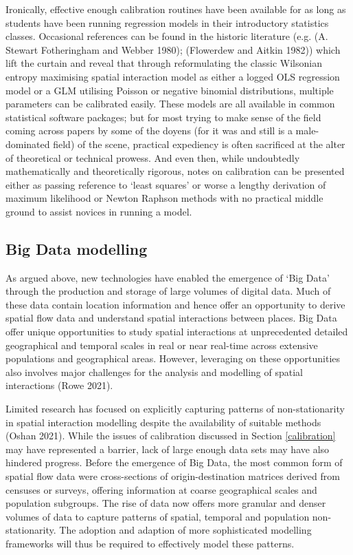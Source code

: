 \documentclass[11pt,letterpaper]{article}
\begin{document}
Ironically, effective enough calibration routines have been available for as long as students have been running regression models in their introductory statistics classes.
Occasional references can be found in the historic literature (e.g. (A. Stewart Fotheringham and Webber 1980); (Flowerdew and Aitkin 1982)) which lift the curtain and reveal that through reformulating the classic Wilsonian entropy maximising spatial interaction model as either a logged OLS regression model or a GLM utilising Poisson or negative binomial distributions, multiple parameters can be calibrated easily.
These models are all available in common statistical software packages; but for most trying to make sense of the field coming across papers by some of the doyens (for it was and still is a male-dominated field) of the scene, practical expediency is often sacrificed at the alter of theoretical or technical prowess.
And even then, while undoubtedly mathematically and theoretically rigorous, notes on calibration can be presented either as passing reference to `least squares' or worse a lengthy derivation of maximum likelihood or Newton Raphson methods with no practical middle ground to assist novices in running a model.

\hypertarget{big-data-modelling}{%
\subsection{\texorpdfstring{Big Data modelling }{Big Data modelling }}\label{big-data-modelling}}

As argued above, new technologies have enabled the emergence of `Big Data' through the production and storage of large volumes of digital data.
Much of these data contain location information and hence offer an opportunity to derive spatial flow data and understand spatial interactions between places.
Big Data offer unique opportunities to study spatial interactions at unprecedented detailed geographical and temporal scales in real or near real-time across extensive populations and geographical areas.
However, leveraging on these opportunities also involves major challenges for the analysis and modelling of spatial interactions (Rowe 2021).

Limited research has focused on explicitly capturing patterns of non-stationarity in spatial interaction modelling despite the availability of suitable methods (Oshan 2021).
While the issues of calibration discussed in Section \ref{calibration} may have represented a barrier, lack of large enough data sets may have also hindered progress.
Before the emergence of Big Data, the most common form of spatial flow data were cross-sections of origin-destination matrices derived from censuses or surveys, offering information at coarse geographical scales and population subgroups.
The rise of data now offers more granular and denser volumes of data to capture patterns of spatial, temporal and population non-stationarity.
The adoption and adaption of more sophisticated modelling frameworks will thus be required to effectively model these patterns.
\end{document}
